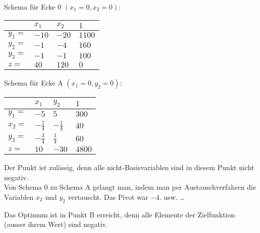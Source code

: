 \noindent Schema f\"ur Ecke 0 $(x_1=0, x_2=0)$:
\begin{center}\begin{tabular}{p{2cm} | p{2cm} p{2cm} | p{2cm} |}
\hline
	& $x_1$ & $x_2$ & $1$ \\
\hline
$y_1 =$ & $-10$   & $-20$   & $1100$ \\
$y_2 =$ & $-1$    & $-4$    & $160$ \\
$y_3 =$ & $-1$    & $-1$    & $100$ \\
\hline
$z =$   & $40$    & $120$   & $0$ \\
\hline
\end{tabular}\end{center}

\noindent Schema f\"ur Ecke A $(x_1=0, y_2=0)$: \\
\begin{center}\begin{tabular}{p{2cm} | p{2cm} p{2cm} | p{2cm} |}
\hline
	& $x_1$          & $y_2$          & $1$ \\
\hline
$y_1 =$ & $-5$           & $5$            & $300$ \\
$x_2 =$ & $-\frac{1}{4}$ & $-\frac{1}{4}$ & $40$ \\
$y_3 =$ & $-\frac{3}{4}$ & $\frac{1}{4}$  & $60$ \\
\hline
$z =$   & $10$           & $-30$          & $4800$ \\
\hline
\end{tabular}\end{center}
Der Punkt ist zul\"assig, denn alle nicht-Basisvariablen sind in diesem Punkt nicht negativ. \\

Von Schema 0 zu Schema A gelangt man, indem man per Austauschverfahren die Variablen $x_2$ und $y_2$ vertauscht. Das Pivot war $-4$. usw. \ldots

Das Optimum ist in Punkt B erreicht, denn alle Elemente der Zielfunktion (ausser ihrem Wert) sind negativ.

